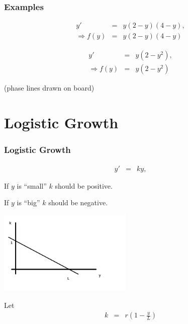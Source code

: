 \documentclass{beamer}
\newcommand{\lp}{\left(}
\newcommand{\rp}{\right)}
\begin{document}
\begin{frame}
  \frametitle{Examples}


  \begin{eqnarray*}
    y' & = & y(2-y)(4-y), \\
    \Rightarrow f(y) & = & y(2-y)(4-y)
  \end{eqnarray*}

  \begin{eqnarray*}
    y' & = & y(2-y^2), \\
    \Rightarrow f(y) & = & y(2-y^2)
  \end{eqnarray*}

  (phase lines drawn on board)

\end{frame}


\section{Logistic Growth}

\begin{frame}
  \frametitle{Logistic Growth}

  \vspace*{-4em}
  \begin{eqnarray*}
    y' & = & ky,
  \end{eqnarray*}
  
  If $y$ is ``small'' $k$ should be positive.

  If $y$ is ``big'' $k$ should be negative.

  \includegraphics[height=4cm]{week3GrowthRate}

  Let 
  \begin{eqnarray*}
    k & = & r \lp 1 - \frac{y}{L} \rp
  \end{eqnarray*}


\end{frame}
\end{document}
